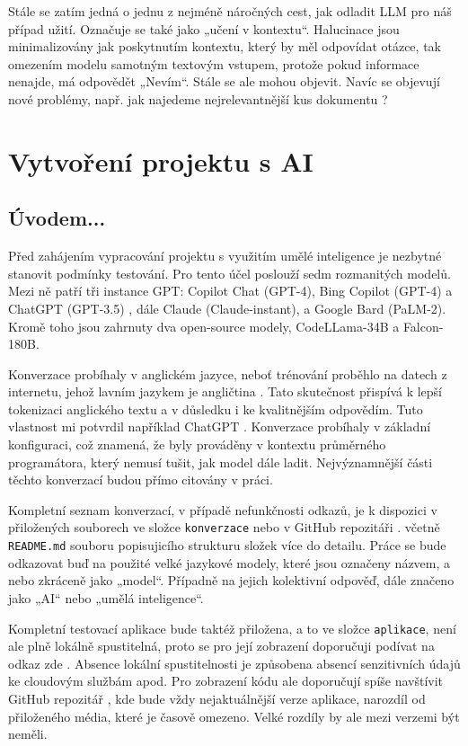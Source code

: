 \documentclass[FM,DP]{tulthesis}
\begin{document}
		Stále se zatím jedná o jednu z nejméně náročných cest, jak odladit LLM pro náš případ užití. Označuje se také jako „učení v kontextu“. Halucinace jsou minimalizovány jak poskytnutím kontextu, který by měl odpovídat otázce, tak omezením modelu samotným textovým vstupem, protože pokud informace nenajde, má odpovědět „Nevím“. Stále se ale mohou objevit. Navíc se objevují nové problémy, např. jak najedeme nejrelevantnější kus dokumentu \cite{paper:RAG}?
		
		\chapter{Vytvoření projektu s AI}
		\section{Úvodem...}
		Před zahájením vypracování projektu s využitím umělé inteligence je nezbytné stanovit podmínky testování. Pro tento účel poslouží sedm rozmanitých modelů. Mezi ně patří tři instance GPT: Copilot Chat (GPT-4), Bing Copilot (GPT-4) a ChatGPT (GPT-3.5) , dále Claude (Claude-instant), a Google Bard (PaLM-2). Kromě toho jsou zahrnuty dva open-source modely, CodeLLama-34B a Falcon-180B.
		
		Konverzace probíhaly v anglickém jazyce, neboť trénování proběhlo na datech z internetu, jehož lavním jazykem je angličtina \cite{internetLanguages}. Tato skutečnost přispívá k lepší tokenizaci anglického textu a v důsledku i ke kvalitnějším odpovědím. Tuto vlastnost mi potvrdil například ChatGPT \cite{chatgpt_jazyk}. Konverzace probíhaly v základní konfiguraci, což znamená, že byly prováděny v kontextu průměrného programátora, který nemusí tušit, jak model dále ladit. Nejvýznamnější části těchto konverzací budou přímo citovány v práci. 
		
		Kompletní seznam konverzací, v případě nefunkčnosti odkazů, je k dispozici v přiložených souborech ve složce \verb|konverzace| nebo v GitHub repozitáři \cite{promptsRepo}. včetně \verb|README.md| souboru popisujicího strukturu složek více do detailu. Práce se bude odkazovat buď na použité velké jazykové modely, které jsou označeny názvem, a nebo zkráceně jako „model“. Případně na jejich kolektivní odpověď, dále značeno jako „AI“ nebo „umělá inteligence“.
		
		Kompletní testovací aplikace bude taktéž přiložena, a to ve složce \verb|aplikace|, není ale plně lokálně spustitelná, proto se pro její zobrazení doporučuji podívat na odkaz zde \cite{final_app}. Absence lokální spustitelnosti je způsobena absencí senzitivních údajů ke cloudovým službám apod. Pro zobrazení kódu ale doporučují spíše navštívit GitHub repozitář \cite{gh_final_app}, kde bude vždy nejaktuálnější verze aplikace, narozdíl od přiloženého média, které je časově omezeno. Velké rozdíly by ale mezi verzemi být neměli. 
		
\end{document}
